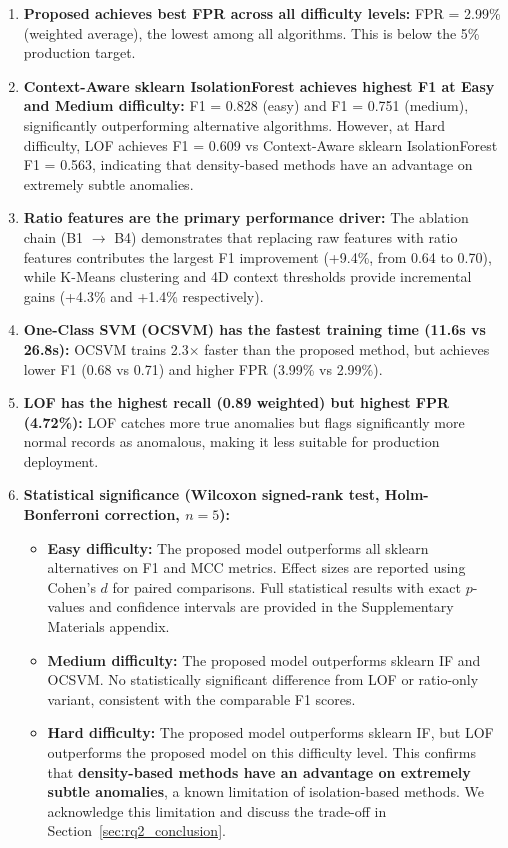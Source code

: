 \begin{enumerate}
    \item \textbf{Proposed achieves best FPR across all difficulty levels:} FPR = 2.99\% (weighted average), the lowest among all algorithms. This is below the 5\% production target.

    \item \textbf{Context-Aware sklearn IsolationForest achieves highest F1 at Easy and Medium difficulty:} F1 = 0.828 (easy) and F1 = 0.751 (medium), significantly outperforming alternative algorithms. However, at Hard difficulty, LOF achieves F1 = 0.609 vs Context-Aware sklearn IsolationForest F1 = 0.563, indicating that density-based methods have an advantage on extremely subtle anomalies.

    \item \textbf{Ratio features are the primary performance driver:} The ablation chain (B1 $\to$ B4) demonstrates that replacing raw features with ratio features contributes the largest F1 improvement (+9.4\%, from 0.64 to 0.70), while K-Means clustering and 4D context thresholds provide incremental gains (+4.3\% and +1.4\% respectively).

    \item \textbf{One-Class SVM (OCSVM) has the fastest training time (11.6s vs 26.8s):} OCSVM trains 2.3$\times$ faster than the proposed method, but achieves lower F1 (0.68 vs 0.71) and higher FPR (3.99\% vs 2.99\%).

    \item \textbf{LOF has the highest recall (0.89 weighted) but highest FPR (4.72\%):} LOF catches more true anomalies but flags significantly more normal records as anomalous, making it less suitable for production deployment.

    \item \textbf{Statistical significance (Wilcoxon signed-rank test, Holm-Bonferroni correction, $n=5$):}
        \begin{itemize}
            \item \textbf{Easy difficulty:} The proposed model outperforms all sklearn alternatives on F1 and MCC metrics. Effect sizes are reported using Cohen's $d$ for paired comparisons. Full statistical results with exact $p$-values and confidence intervals are provided in the Supplementary Materials appendix.
            \item \textbf{Medium difficulty:} The proposed model outperforms sklearn IF and OCSVM. No statistically significant difference from LOF or ratio-only variant, consistent with the comparable F1 scores.
            \item \textbf{Hard difficulty:} The proposed model outperforms sklearn IF, but LOF outperforms the proposed model on this difficulty level. This confirms that \textbf{density-based methods have an advantage on extremely subtle anomalies}, a known limitation of isolation-based methods. We acknowledge this limitation and discuss the trade-off in Section~\ref{sec:rq2_conclusion}.
        \end{itemize}
\end{enumerate}

